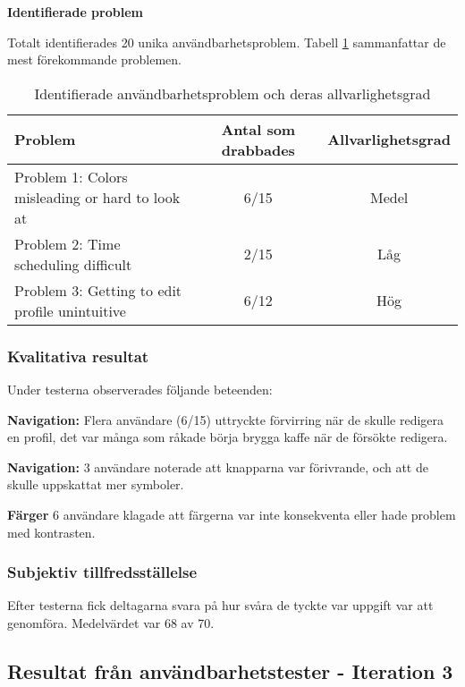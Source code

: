 \textbf{Identifierade problem}

Totalt identifierades 20 unika användbarhetsproblem. Tabell \ref{tab:problem} sammanfattar de mest förekommande problemen.
\begin{table}[h]
\centering
\begin{tabular}{|p{6cm}|c|c|}
\hline
\textbf{Problem} & \textbf{Antal som drabbades} & \textbf{Allvarlighetsgrad} \\
\hline
Problem 1: Colors misleading or hard to look at & 6/15 & Medel\\
Problem 2: Time scheduling difficult & 2/15 &  Låg \\
Problem 3: Getting to edit profile unintuitive & 6/12 & Hög\\
\hline
\end{tabular}
\caption{Identifierade användbarhetsproblem och deras allvarlighetsgrad}
\label{tab:problem}
\end{table}


\subsubsection{Kvalitativa resultat}

Under testerna observerades följande beteenden:

\textbf{Navigation:} Flera användare (6/15) uttryckte förvirring när de skulle redigera en profil, det var många som råkade börja brygga kaffe när de försökte redigera.

\textbf{Navigation:} 3 användare noterade att knapparna var förivrande, och att de skulle uppskattat mer symboler. 

\textbf{Färger} 6 användare klagade att färgerna var inte konsekventa eller hade problem med kontrasten. 


\subsubsection{Subjektiv tillfredsställelse}

Efter testerna fick deltagarna svara på hur svåra de tyckte var uppgift var att genomföra. Medelvärdet var 68 av 70.




\subsection{Resultat från användbarhetstester - Iteration 3}

